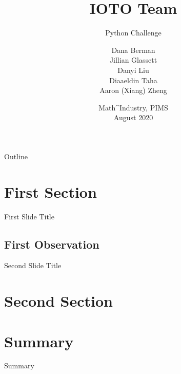 \documentclass[compress]{beamer}
\title{IOTO Team}
\subtitle{Python Challenge}
\author[D. Berman, J.Glassett, D. Liu, D. Taha, A.Zheng]{Dana Berman\\ Jillian Glassett\\ Danyi Liu\\ Diaaeldin Taha\\  Aaron (Xiang) Zheng}
\date{Math\^{}Industry, PIMS\\
August 2020}
\begin{document}
\begin{frame}
  \titlepage
\end{frame}

\begin{frame}{Outline}
  \tableofcontents
\end{frame}

\section{First Section}


\begin{frame}{First Slide Title}

\end{frame}

    



\subsection{First Observation}

\begin{frame}{Second Slide Title}
 

\end{frame}

\section{Second Section}

\subsection{}



\section*{Summary}

\begin{frame}{Summary}
  
\end{frame}
\end{document}
